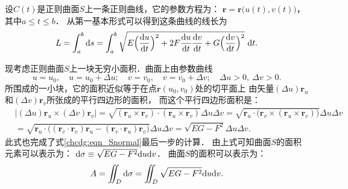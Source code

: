 设$C(t)$是正则曲面$S$上一条正则曲线，它的参数方程为：
$\boldsymbol{r}=\boldsymbol{r}\bigl(u(t),v(t)\bigr)$，其中$a\leqslant t\leqslant b$．
从第一基本形式可以得到这条曲线的线长为
\begin{equation}
    L=\int_{a}^{b} {\rm d}s = \int_{a}^{b}
    \sqrt{E \Bigl(\frac{{\rm d}u }{{\rm d}t}\Bigr)^2 
      + 2 F \frac{{\rm d}u }{{\rm d}t} \frac{{\rm d}v }{{\rm d}t} 
      + G \Bigl(\frac{{\rm d}v }{{\rm d}t}\Bigr)^2 } \ {\rm d}t.
\end{equation}


现考虑正则曲面$S$上一块无穷小面积．曲面上由参数曲线
\begin{equation*}
    u=u_0,\quad u=u_0+\Delta u;\quad v=v_0,\quad  v=v_0+\Delta v ;
    \quad \Delta u>0,\  \Delta v >0 .
\end{equation*}
所围成的一小块，它的面积近似等于在点$\boldsymbol{r}(u_0,v_0)$处的切平面上
由矢量$(\Delta u) \boldsymbol{r}_u$和$(\Delta v) \boldsymbol{r}_v$所张成的平行四边形的面积，
而这个平行四边形面积是：
\begin{align*} %
    &\bigl|(\Delta u) \boldsymbol{r}_u \times (\Delta v) \boldsymbol{r}_v \bigr|
    =\sqrt{(\boldsymbol{r}_u \times \boldsymbol{r}_v)\cdot (\boldsymbol{r}_u 
        \times \boldsymbol{r}_v) } \Delta u \Delta v 
    =\sqrt{\boldsymbol{r}_u \cdot \bigl( \boldsymbol{r}_v\times 
        (\boldsymbol{r}_u \times \boldsymbol{r}_v) \bigr)} \Delta u \Delta v \\
    &=\sqrt{\boldsymbol{r}_u \cdot \bigl( (\boldsymbol{r}_v\cdot\boldsymbol{r}_v)\boldsymbol{r}_u  
        -(\boldsymbol{r}_v \cdot \boldsymbol{r}_u)\boldsymbol{r}_v \bigr)} \Delta u \Delta v 
    =\sqrt{EG-F^2}    \Delta u \Delta v  .
\end{align*} %
此式也完成了式\eqref{chcdg:eqn_Snormal}最后一步的计算．
由上式可知曲面$S$的{\heiti 面积元素}可以表示为：
$    {\rm d}\sigma \equiv \sqrt{EG-F^2}    {\rm d} u {\rm d} v $．
曲面$S$的面积可以表示为：
\begin{equation}
    A=\iint_D {\rm d}\sigma = \iint_D \sqrt{EG-F^2}    {\rm d} u {\rm d} v .
\end{equation}



